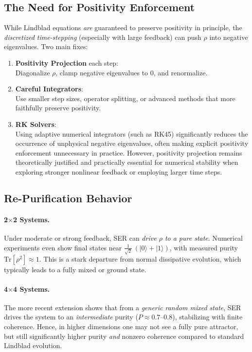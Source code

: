 \documentclass{article}
\begin{document}
\subsection{The Need for Positivity Enforcement}
While Lindblad equations \emph{are} guaranteed to preserve positivity in principle, the \emph{discretized time-stepping} (especially with large feedback) can push $\rho$ into negative eigenvalues. Two main fixes:

\begin{enumerate}
\item \textbf{Positivity Projection} each step:\\
Diagonalize $\rho$, clamp negative eigenvalues to 0, and renormalize.

\item \textbf{Careful Integrators}:\\
Use smaller step sizes, operator splitting, or advanced methods that more faithfully preserve positivity.

\item \textbf{RK Solvers}:\\
Using adaptive numerical integrators (such as RK45) significantly reduces the occurrence of unphysical negative eigenvalues, often making explicit positivity enforcement unnecessary in practice. However, positivity projection remains theoretically justified and practically essential for numerical stability when exploring stronger nonlinear feedback or employing larger time steps.
\end{enumerate}

\subsection{Re-Purification Behavior}
\paragraph{2$\times$2 Systems.} Under moderate or strong feedback, SER can \emph{drive $\rho$ to a pure state}. Numerical experiments even show final states near $\tfrac1{\sqrt2}\,(|0\rangle + |1\rangle)$, with measured purity $\mathrm{Tr}[\rho^2] \approx 1$. This is a stark departure from normal dissipative evolution, which typically leads to a fully mixed or ground state.

\paragraph{4$\times$4 Systems.} The more recent extension shows that from a \emph{generic random mixed state}, SER drives the system to an \emph{intermediate} purity ($P \approx 0.7\text{--}0.8$), stabilizing with finite coherence. Hence, in higher dimensions one may not see a fully pure attractor, but still significantly higher purity \emph{and} nonzero coherence compared to standard Lindblad evolution.
\end{document}
